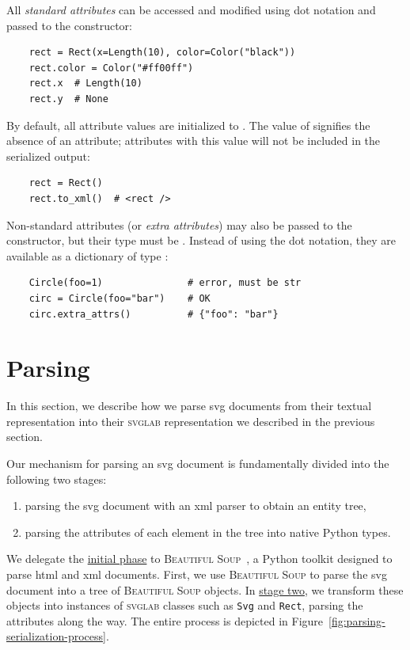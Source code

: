 All \emph{standard attributes} can be accessed and modified using dot notation and passed to the constructor:
\begin{verbatim}
    rect = Rect(x=Length(10), color=Color("black"))
    rect.color = Color("#ff00ff")
    rect.x  # Length(10)
    rect.y  # None
\end{verbatim}

By default, all attribute values are initialized to . The value of  signifies the absence of an attribute; attributes with this value will not be included in the serialized output:
\begin{verbatim}
    rect = Rect()
    rect.to_xml()  # <rect />
\end{verbatim}

Non-standard attributes (or \emph{extra attributes}) may also be passed to the constructor, but their type must be . Instead of using the dot notation, they are available as a dictionary of type :
\begin{verbatim}
    Circle(foo=1)               # error, must be str
    circ = Circle(foo="bar")    # OK
    circ.extra_attrs()          # {"foo": "bar"}
\end{verbatim}

\section{Parsing}\label{impl:parsing}

In this section, we describe how we parse \gls{svg} documents from their textual representation into their \textsc{svglab} representation we described in the previous section.

Our mechanism for parsing an \gls{svg} document is fundamentally divided into the following two stages:
\begin{enumerate}
    \item \label{parsing-1} parsing the \gls{svg} document with an \gls{xml} parser to obtain an entity tree,
    \item \label{parsing-2} parsing the attributes of each element in the tree into native Python types.
\end{enumerate}

We delegate the \hyperref[parsing-1]{initial phase} to \textsc{Beautiful Soup}~\cite{beautifulsoup4}, a Python toolkit designed to parse \gls{html} and \gls{xml} documents. First, we use \textsc{Beautiful Soup} to parse the \gls{svg} document into a tree of \textsc{Beautiful Soup} objects. In \hyperref[parsing-2]{stage two}, we transform these objects into instances of \textsc{svglab} classes such as \texttt{Svg} and \texttt{Rect}, parsing the attributes along the way. The entire process is depicted in Figure~\ref{fig:parsing-serialization-process}.

